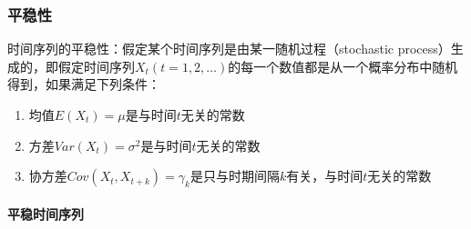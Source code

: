 \documentclass[12pt]{book}
\begin{document}
\subsubsection{平稳性}







时间序列的平稳性：假定某个时间序列是由某一随机过程（stochastic process）生成的，即假定时间序列${X_t}(t=1,2,…)$的每一个数值都是从一个概率分布中随机得到，如果满足下列条件：
\begin{enumerate}[(1)]
    \item 均值$E(X_t)=\mu$是与时间$t$无关的常数  
    \item 方差$Var(X_t)=\sigma^2$是与时间$t$无关的常数  
    \item 协方差$Cov\left(X_t,X_{t+k}\right)=\gamma_k$是只与时期间隔$k$有关，与时间$t$无关的常数
\end{enumerate}


\paragraph{平稳时间序列}
\end{document}
